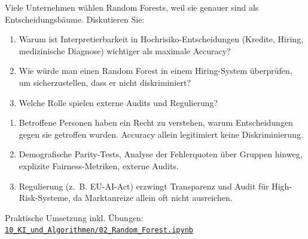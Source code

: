 \begin{mychallenge}
    Viele Unternehmen wählen Random Forests, weil sie genauer sind als Entscheidungsbäume. Diskutieren Sie:
    \begin{enumerate}
        \item Warum ist Interpretierbarkeit in Hochrisiko-Entscheidungen (Kredite, Hiring, medizinische Diagnose) wichtiger als maximale Accuracy?
        \item Wie würde man einen Random Forest in einem Hiring-System überprüfen, um sicherzustellen, dass er nicht diskriminiert?
        \item Welche Rolle spielen externe Audits und Regulierung?
    \end{enumerate}
    \begin{myanswer}
        \begin{enumerate}
            \item Betroffene Personen haben ein Recht zu verstehen, warum Entscheidungen gegen sie getroffen wurden. Accuracy allein legitimiert keine Diskriminierung.
            \item Demografische Parity-Tests, Analyse der Fehlerquoten über Gruppen hinweg, explizite Fairness-Metriken, externe Audits.
            \item Regulierung (z.~B. EU-AI-Act) erzwingt Transparenz und Audit für High-Risk-Systeme, da Marktanreize allein oft nicht ausreichen.
        \end{enumerate}
    \end{myanswer}
\end{mychallenge}

\begin{myremark}[Notebook]
    Praktische Umsetzung inkl. Übungen:
    \href{\notebookurl}{\texttt{10\_KI\_und\_Algorithmen/02\_Random\_Forest.ipynb}}
\end{myremark}
